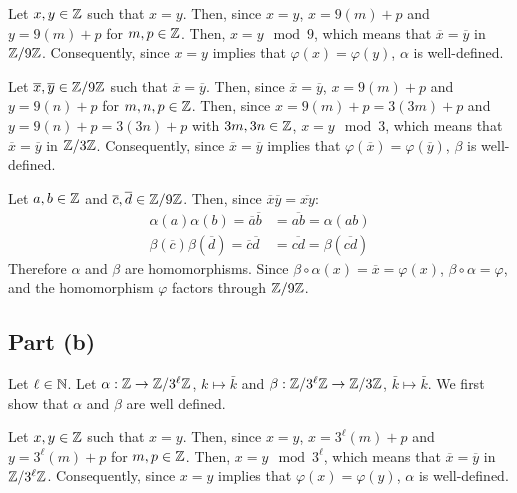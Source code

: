 \documentclass{article}
\begin{document}
Let $x, y \in \mathbb{Z}$ such that $x = y$. Then, since $x = y$, $x = 9\left(m\right) + p$ and $y = 9\left(m\right) + p$ for $m, p \in \mathbb{Z}$. Then, $x = y \mod 9$, which means that $\overline{x} = \overline{y}$ in $\mathbb{Z}/9\mathbb{Z}$. Consequently, since $x = y$ implies that $\varphi\left(x\right) = \varphi\left(y\right)$, $\alpha$ is well-defined.

Let $\overline{x}, \overline{y} \in \mathbb{Z}/9\mathbb{Z}$ such that $\overline{x} = \overline{y}$. Then, since $\overline{x} = \overline{y}$, $x = 9\left(m\right) + p$ and $y = 9\left(n\right) + p$ for $m, n, p \in \mathbb{Z}$. Then, since $x = 9\left(m\right) + p = 3\left(3m\right) + p$ and $y = 9\left(n\right) + p = 3\left(3n\right) + p$ with $3m, 3n \in \mathbb{Z}$, $x = y \mod 3$, which means that $\overline{x} = \overline{y}$ in $\mathbb{Z}/3\mathbb{Z}$. Consequently, since $\overline{x} = \overline{y}$ implies that $\varphi\left(\overline{x}\right) = \varphi\left(\overline{y}\right)$, $\beta$ is well-defined.

Let $a, b \in \mathbb{Z}$ and $\overline{c}, \overline{d} \in \mathbb{Z}/9\mathbb{Z}$. Then, since $\overline{x}\overline{y} = \overline{xy}$:
\begin{equation}
    \begin{split}
        \alpha\left(a\right)\alpha\left(b\right) = \overline{a}\overline{b} & = \overline{ab} = \alpha\left(ab\right) \\
        \beta\left(\overline{c}\right)\beta\left(\overline{d}\right) = \overline{c}\overline{d} & = \overline{cd} = \beta\left(\overline{cd}\right)
    \end{split}
\end{equation}
Therefore $\alpha$ and $\beta$ are homomorphisms. Since $\beta \circ \alpha \left(x\right) = \overline{x} = \varphi\left(x\right)$, $\beta \circ \alpha = \varphi$, and the homomorphism $\varphi$ factors through $\mathbb{Z}/9\mathbb{Z}$.

\subsection*{Part (b)}
Let $\ell \in \mathbb{N}$. Let $\alpha: \mathbb{Z} \to \mathbb{Z}/3^\ell\mathbb{Z}$, $k \mapsto \bar k$ and $\beta: \mathbb{Z}/3^\ell\mathbb{Z} \to \mathbb{Z}/3\mathbb{Z}$, $\bar k \mapsto \bar k$. We first show that $\alpha$ and $\beta$ are well defined.

Let $x, y \in \mathbb{Z}$ such that $x = y$. Then, since $x = y$, $x = 3^\ell\left(m\right) + p$ and $y = 3^\ell\left(m\right) + p$ for $m, p \in \mathbb{Z}$. Then, $x = y \mod 3^\ell$, which means that $\overline{x} = \overline{y}$ in $\mathbb{Z}/3^\ell\mathbb{Z}$. Consequently, since $x = y$ implies that $\varphi\left(x\right) = \varphi\left(y\right)$, $\alpha$ is well-defined.
\end{document}

